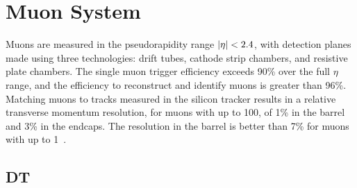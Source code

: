 
\section{Muon System}

Muons are measured in the pseudorapidity range $\lvert \eta \rvert < 2.4$, with detection planes made using three technologies: drift tubes, cathode strip chambers, and resistive plate chambers. The single muon trigger efficiency exceeds 90\% over the full $\eta$ range, and the efficiency to reconstruct and identify muons is greater than 96\%. Matching muons to tracks measured in the silicon tracker results in a relative transverse momentum resolution, for muons with \pt up to 100\GeV, of 1\% in the barrel and 3\% in the endcaps. The \pt resolution in the barrel is better than 7\% for muons with \pt up to 1\TeV~\cite{Sirunyan:2018}. 


\subsection{DT}
